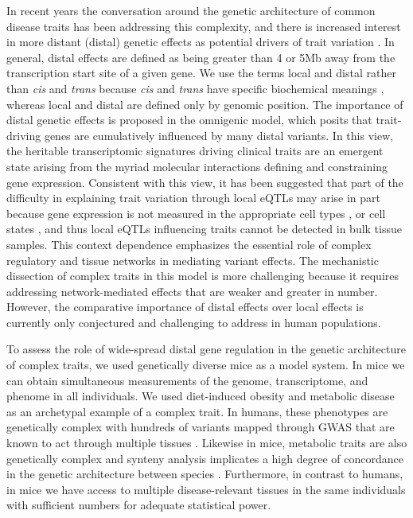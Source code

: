 \documentclass[
]{article}
\begin{document}
In recent years the conversation around the genetic architecture of
common disease traits has been addressing this complexity, and there is
increased interest in more distant (distal) genetic effects as potential
drivers of trait variation \cite{pmid37857933, 
pmid32424349, pmid32831138, pmid30950127, pmid24013639}. In general,
distal effects are defined as being greater than 4 or 5Mb away from the
transcription start site of a given gene. We use the terms local and
distal rather than \textit{cis} and \textit{trans} because \textit{cis}
and \textit{trans} have specific biochemical meanings
\cite{pmid18597885}, whereas local and distal are defined only by
genomic position. The importance of distal genetic effects is proposed
in the omnigenic model, which posits that trait-driving genes are
cumulatively influenced by many distal variants. In this view, the
heritable transcriptomic signatures driving clinical traits are an
emergent state arising from the myriad molecular interactions defining
and constraining gene expression. Consistent with this view, it has been
suggested that part of the difficulty in explaining trait variation
through local eQTLs may arise in part because gene expression is not
measured in the appropriate cell types \cite{pmid32912663}, or cell
states \cite{pmid35545678}, and thus local eQTLs influencing traits
cannot be detected in bulk tissue samples. This context dependence
emphasizes the essential role of complex regulatory and tissue networks
in mediating variant effects. The mechanistic dissection of complex
traits in this model is more challenging because it requires addressing
network-mediated effects that are weaker and greater in number. However,
the comparative importance of distal effects over local effects is
currently only conjectured and challenging to address in human
populations.

To assess the role of wide-spread distal gene regulation in the genetic
architecture of complex traits, we used genetically diverse mice as a
model system. In mice we can obtain simultaneous measurements of the
genome, transcriptome, and phenome in all individuals. We used
diet-induced obesity and metabolic disease as an archetypal example of a
complex trait. In humans, these phenotypes are genetically complex with
hundreds of variants mapped through GWAS \cite{pmid36350656, 
pmid34556834} that are known to act through multiple tissues
\cite{pmid28089486, pmid10889786}. Likewise in mice, metabolic traits
are also genetically complex \cite{pmid31343992} and synteny analysis
implicates a high degree of concordance in the genetic architecture
between species \cite{pmid31343992, pmid29567659}. Furthermore, in
contrast to humans, in mice we have access to multiple disease-relevant
tissues in the same individuals with sufficient numbers for adequate
statistical power.
\end{document}
